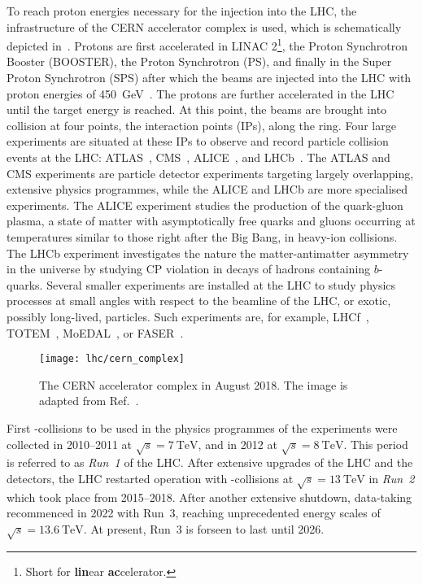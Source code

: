 To reach proton energies necessary for the injection into the LHC, the
infrastructure of the CERN accelerator complex is used, which is schematically
depicted in~. Protons are first accelerated
in LINAC 2\footnote{Short for \textbf{lin}ear \textbf{ac}celerator.}, the Proton
Synchrotron Booster (BOOSTER), the Proton Synchrotron (PS), and finally in the
Super Proton Synchrotron (SPS) after which the beams are injected into the LHC
with proton energies of \SI{450}{\GeV}~\cite{Evans:2008zzb}. The protons are
further accelerated in the LHC until the target energy is reached. At this
point, the beams are brought into collision at four points, the interaction
points (IPs), along the ring. Four large experiments are situated at these IPs
to observe and record particle collision events at the LHC:
ATLAS~\cite{PERF-2007-01}, CMS~\cite{CMS-CMS-00-001},
ALICE~\cite{ALICE:2008ngc}, and LHCb~\cite{LHCb:2008vvz}. The ATLAS and CMS
experiments are particle detector experiments targeting largely overlapping,
extensive physics programmes, while the ALICE and LHCb are more specialised
experiments. The ALICE experiment studies the production of the quark-gluon
plasma, a state of matter with asymptotically free quarks and gluons occurring
at temperatures similar to those right after the Big Bang, in heavy-ion
collisions. The LHCb experiment investigates the nature the matter-antimatter
asymmetry in the universe by studying CP violation in decays of hadrons
containing $b$-quarks. Several smaller experiments are installed at the LHC to
study physics processes at small angles with respect to the beamline of the LHC,
or exotic, possibly long-lived, particles. Such experiments are, for example,
LHCf~\cite{LHCf:2008lfy}, TOTEM~\cite{TOTEM:2008lue},
MoEDAL~\cite{MoEDAL:2009jwa}, or FASER~\cite{FASER:2019aik}.

\begin{figure}[htbp]
  \centering

  \texttt{[image: lhc/cern\_complex]}

  \caption{The CERN accelerator complex in August 2018. The image is adapted
    from Ref.~\cite{Mobs:2684277}.}%
  \label{fig:cern_accelerator_complex}
\end{figure}

First \pp-collisions to be used in the physics programmes of the experiments
were collected in 2010--2011 at $\sqrt{s} = \SI{7}{\TeV}$, and in 2012 at
$\sqrt{s} = \SI{8}{\TeV}$. This period is referred to as \emph{Run~1} of the
LHC. After extensive upgrades of the LHC and the detectors, the LHC restarted
operation with \pp-collisions at $\sqrt{s} = \SI{13}{\TeV}$ in \emph{Run~2}
which took place from 2015--2018. After another extensive shutdown, data-taking
recommenced in 2022 with Run~3, reaching unprecedented energy scales of
$\sqrt{s} = \SI{13.6}{\TeV}$. At present, Run~3 is forseen to last until 2026.


